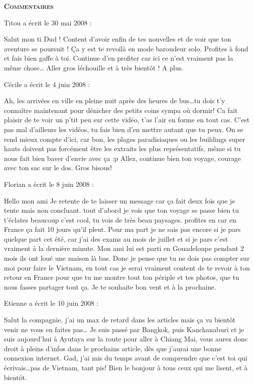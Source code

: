 \bigskip
\textbf{\textsc{Commentaires}}

\medskip
Titou a écrit le 30 mai 2008 :
\begin{displayquote}
Salut mon ti Dud !
Content d'avoir enfin de tes nouvelles et de voir que ton aventure se poursuit ! Ça y est te revoilà en mode baroudeur solo. Profites à fond et fais bien gaffe à toi.
Continue d'en profiter car ici ce n'est vraiment pas la même chose\dots
Aller gros léchouille et à très bientôt !
A plus.
\end{displayquote}

\medskip
Cécile a écrit le 4 juin 2008 :
\begin{displayquote}
Ah, les arrivées en ville en pleine nuit après des heures de bus\dots tu dois t'y connaître maintenant pour dénicher des petits coins sympa où dormir!
Ca fait plaisir de te voir un p'tit peu sur cette vidéo, t'as l'air en forme en tout cas. C'est pas mal d'ailleurs les vidéos, tu fais bien d'en mettre autant que tu peux. On se rend mieux compte d'ici, car bon, les plages paradisiaques ou les buildings super hauts doivent pas forcément être les extraits les plus représentatifs, même si tu nous fait bien baver d'envie avec ça :p
Allez, continue bien ton voyage, courage avec ton sac sur le dos.
Gros bisous!
\end{displayquote}

\medskip
Florian a écrit le 8 juin 2008 :
\begin{displayquote}
Hello mon ami
Je retente de te laisser un message car ça fait deux fois que je tente mais non concluant. tout d'abord je vois que ton voyage se passe bien tu t'éclates beaucoup c'est cool, tu vois de très beau paysages. profites en car en France ça fait 10 jours qu'il pleut.
Pour ma part je ne sais pas encore si je pars quelque part cet été, car j'ai des exams au mois de juillet et si je pars c'est vraiment à la dernière minute.
Mon ami lui est parti en Gouadeloupe pendant 2 mois ils ont loué une maison là bas.
Donc je pense que tu ne dois pas compter sur moi pour faire le Vietnam, en tout cas je serai vraiment content de te revoir à ton retour en France pour que tu me montre tout ton périple et tes photos, que tu nous fasses partager tout ça.
Je te souhaite bon vent et à la prochaine.
\end{displayquote}

\medskip
Etienne a écrit le 10 juin 2008 :
\begin{displayquote}
Salut la compagnie, j'ai un max de retard dans les articles mais ça va bientôt venir ne vous en faites pas\dots
Je suis passé par Bangkok, puis Kanchanaburi et je suis aujourd'hui à Ayutaya sur la route pour aller à Chiang Mai, vous aurez donc droit à pleins d'infos dans le prochains article, dès que j'aurai une bonne connexion internet.
Gad, j'ai mis du temps avant de comprendre que c'est toi qui écrivais\dots pas de Vietnam, tant pis!
Bien le bonjour à tous ceux qui me lisent, et à bientôt.
\end{displayquote}

